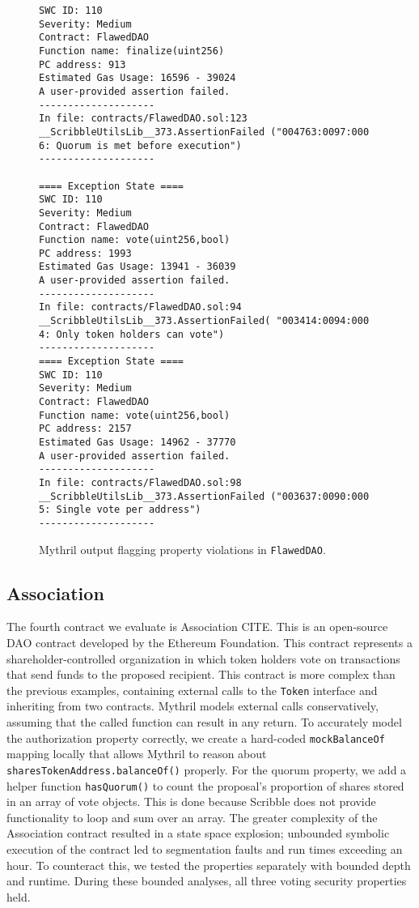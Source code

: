 \documentclass[conference]{IEEEtran}
\begin{document}
\begin{figure}[h]
\centering
\begin{lstlisting}[basicstyle=\ttfamily\small,breaklines=true]
SWC ID: 110
Severity: Medium
Contract: FlawedDAO
Function name: finalize(uint256)
PC address: 913
Estimated Gas Usage: 16596 - 39024
A user-provided assertion failed.
--------------------
In file: contracts/FlawedDAO.sol:123
__ScribbleUtilsLib__373.AssertionFailed ("004763:0097:000 6: Quorum is met before execution")
--------------------

==== Exception State ====
SWC ID: 110
Severity: Medium
Contract: FlawedDAO
Function name: vote(uint256,bool)
PC address: 1993
Estimated Gas Usage: 13941 - 36039
A user-provided assertion failed.
--------------------
In file: contracts/FlawedDAO.sol:94
__ScribbleUtilsLib__373.AssertionFailed( "003414:0094:000 4: Only token holders can vote")
--------------------
==== Exception State ====
SWC ID: 110
Severity: Medium
Contract: FlawedDAO
Function name: vote(uint256,bool)
PC address: 2157
Estimated Gas Usage: 14962 - 37770
A user-provided assertion failed.
--------------------
In file: contracts/FlawedDAO.sol:98
__ScribbleUtilsLib__373.AssertionFailed ("003637:0090:000 5: Single vote per address")
--------------------
\end{lstlisting}
\caption{Mythril output flagging property violations in \texttt{FlawedDAO}.}
\label{fig:flawed_dao_assertions}
\end{figure}

\subsection{Association} The fourth contract we evaluate is Association CITE. This is an open-source DAO contract developed by the Ethereum Foundation. This contract represents a shareholder-controlled organization in which token holders vote on transactions that send funds to the proposed recipient. This contract is more complex than the previous examples, containing external calls to the \texttt{Token} interface and inheriting from two contracts. Mythril models external calls conservatively, assuming that the called function can result in any return. To accurately model the authorization property correctly, we create a hard-coded \texttt{mockBalanceOf} mapping locally that allows Mythril to reason about \texttt{sharesTokenAddress.balanceOf()} properly. For the quorum property, we add a helper function \texttt{hasQuorum()} to count the proposal's proportion of shares stored in an array of vote objects. This is done because Scribble does not provide functionality to loop and sum over an array.
The greater complexity of the Association contract resulted in a state space explosion; unbounded symbolic execution of the contract led to segmentation faults and run times exceeding an hour. To counteract this, we tested the properties separately with bounded depth and runtime. During these bounded analyses, all three voting security properties held.
\end{document}
